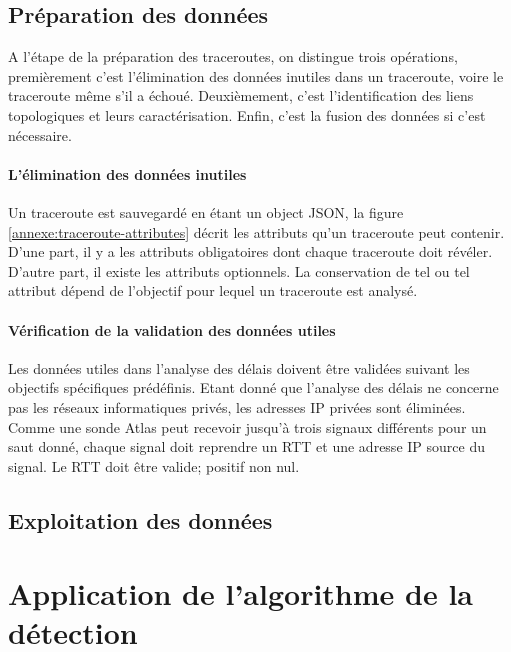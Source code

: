 \subsection{Préparation des données}
 A l'étape de la préparation des traceroutes, on distingue trois opérations, premièrement c'est l'élimination des données inutiles dans un traceroute, voire le traceroute même s'il a échoué. Deuxièmement, c'est l'identification des liens topologiques et leurs caractérisation. Enfin, c'est la fusion des données si c'est nécessaire. 
 
\paragraph{L'élimination des données inutiles}  Un traceroute est sauvegardé en étant un object JSON, la figure \ref{annexe:traceroute-attributes} décrit les attributs qu'un traceroute peut contenir. D'une part, il y a les attributs obligatoires dont chaque traceroute doit révéler. D'autre part, il existe les attributs optionnels.  La conservation de tel ou tel attribut dépend de l'objectif pour lequel un traceroute est analysé.  

\paragraph{Vérification de la validation des données utiles} Les données utiles dans l'analyse des délais doivent être validées suivant les objectifs spécifiques prédéfinis. Etant donné que l'analyse des délais ne concerne pas les réseaux informatiques privés, les adresses IP privées sont éliminées. Comme une sonde Atlas peut recevoir jusqu'à trois signaux différents pour un saut donné, chaque signal doit reprendre un RTT et une adresse IP source du signal. Le RTT doit être valide; positif non nul.
 
\subsection{Exploitation des données}

\section{Application de l'algorithme de la détection}


